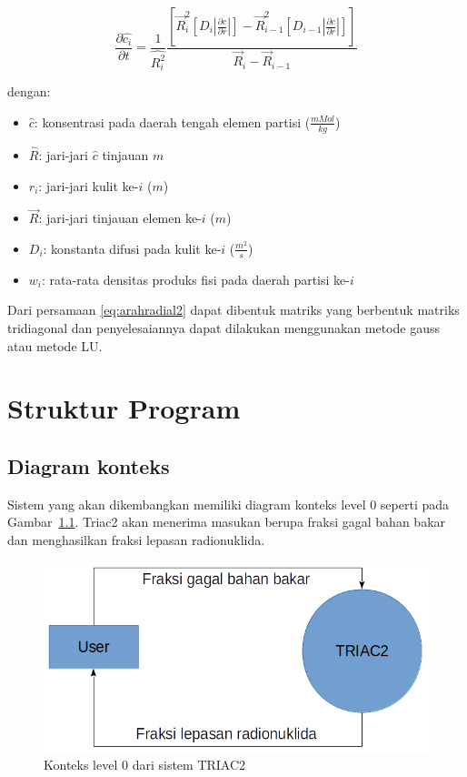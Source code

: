 \documentclass[a4paper,11pt]{report}
\renewcommand{\figurename}{Gambar}
\begin{document}
\begin{equation}
\frac{\partial \hat{c_i}}{\partial t}=\frac{1}{\hat{R_i^2}}\frac{\left[\vec{R}_i^2\left[D_i\left|\frac{\partial c}{\partial r}\right|\right] -\vec{R}_{i-1}^2\left[D_{i-1}\left|\frac{\partial c}{\partial r}\right|\right]\right]}{\vec{R}_i-\vec{R}_{i-1}}
\label{eq:arahradial2}
\end{equation}

dengan:
\begin{itemize}
  \item $\hat{c}$: konsentrasi pada daerah tengah elemen partisi ($\frac{mMol}{kg}$)
  \item $\hat{R}$: jari-jari $\hat{c}$  tinjauan $m$
  \item $r_i$: jari-jari kulit ke-$i$ ($m$)
  \item $\vec{R}$: jari-jari tinjauan elemen ke-$i$ ($m$)
  \item $D_i$: konstanta difusi pada kulit ke-$i$ ($\frac{m^2}{s}$)
  \item $w_i$: rata-rata densitas produks fisi pada daerah partisi ke-$i$
\end{itemize}

Dari persamaan \ref{eq:arahradial2} dapat dibentuk matriks yang berbentuk matriks tridiagonal dan penyelesaiannya dapat dilakukan menggunakan metode gauss atau metode LU.

\chapter{Struktur Program}
\section{Diagram konteks}
Sistem yang akan dikembangkan memiliki diagram konteks level 0 seperti pada \figurename~\ref{fig:level0}. Triac2 akan menerima masukan berupa fraksi gagal bahan bakar dan menghasilkan fraksi lepasan radionuklida. 

\begin{figure}[h!]
  \begin{center}
    \includegraphics[scale=.5]{pics/contextLevel0.png}
    \caption{Konteks level 0 dari sistem TRIAC2}
    \label{fig:level0}
  \end{center}
\end{figure}
\end{document}
